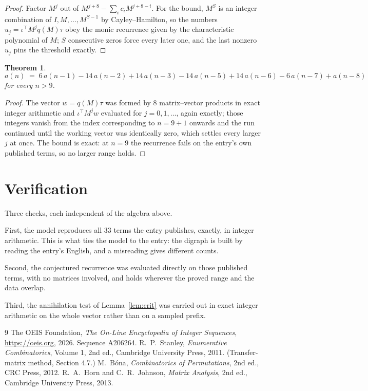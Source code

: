 \documentclass[11pt,a4paper]{article}
\theoremstyle{plain}
\newtheorem{theorem}{Theorem}
\theoremstyle{definition}
\begin{document}
\begin{proof}
Factor $M^{j}$ out of $M^{j+8}-\sum_ic_iM^{j+8-i}$. For the bound, $M^{S}$
is an integer combination of $I,M,\dots,M^{S-1}$ by Cayley--Hamilton, so the numbers
$u_j=\iota^{\!\top}M^{j}q(M)\tau$ obey the monic recurrence given by the characteristic
polynomial of $M$; $S$ consecutive zeros force every later one, and the last nonzero $u_j$
pins the threshold exactly.
\end{proof}

\begin{theorem}
\[
a(n)\;=\;6\,a(n-1) - 14\,a(n-2) + 14\,a(n-3) - 14\,a(n-5) + 14\,a(n-6) - 6\,a(n-7) + a(n-8)
\]
for every $n>9$.
\end{theorem}

\begin{proof}
The vector $w=q(M)\tau$ was formed by $8$ matrix--vector products in exact integer
arithmetic and $\iota^{\!\top}M^{j}w$ evaluated for $j=0,1,\dots$, again exactly; those
integers vanish from the index corresponding to $n=9+1$ onwards and the run continued
until the working vector was identically zero, which settles every larger $j$ at once. The bound is exact: at $n=9$ the recurrence fails on the entry's own published terms, so no larger range holds.
\end{proof}

\section{Verification}

Three checks, each independent of the algebra above.

First, the model reproduces all $33$ terms the entry publishes, exactly, in integer
arithmetic. This is what ties the model to the entry: the digraph is built by reading the
entry's English, and a misreading gives different counts.

Second, the conjectured recurrence was evaluated directly on those published terms, with no
matrices involved, and holds wherever the proved range and the data overlap.

Third, the annihilation test of Lemma~\ref{lem:crit} was carried out in exact integer
arithmetic on the whole vector rather than on a sampled prefix.

\begin{thebibliography}{9}
 The OEIS Foundation, \emph{The On-Line Encyclopedia of Integer
Sequences}, \url{https://oeis.org}, 2026. Sequence A206264.
 R.~P.~Stanley, \emph{Enumerative Combinatorics}, Volume 1, 2nd ed.,
Cambridge University Press, 2011. (Transfer-matrix method, Section 4.7.)
 M.~B\'ona, \emph{Combinatorics of Permutations}, 2nd ed., CRC
Press, 2012.
 R.~A.~Horn and C.~R.~Johnson, \emph{Matrix Analysis}, 2nd ed., Cambridge
University Press, 2013.
\end{thebibliography}
\end{document}
